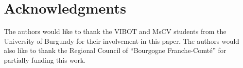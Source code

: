 \section{Acknowledgments}
The authors would like to thank the VIBOT and MsCV students from the University of Burgundy for their involvement in this paper. The authors would also like to thank the Regional Council of ``Bourgogne Franche-Comt\'e'' for partially funding this work.